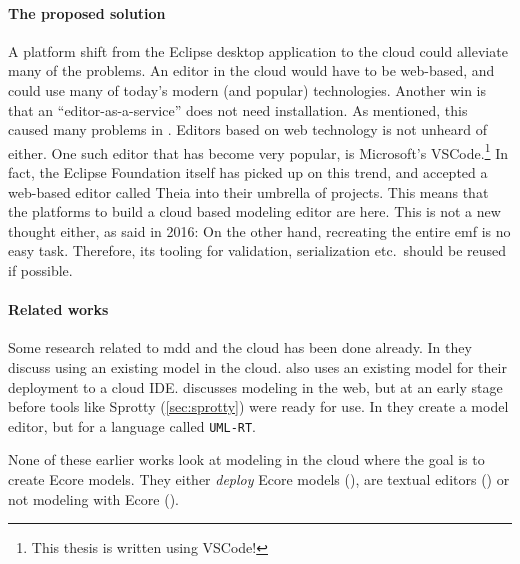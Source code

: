 \paragraph*{The proposed solution}
A platform shift from the \gls{Eclipse} desktop application to the \gls{cloud} could alleviate many of the problems. An editor in the \gls{cloud} would have to be web-based, and could use many of today's modern (and popular) technologies. 
Another win is that an ``editor-as-a-service'' does not need installation.
As mentioned, this caused many problems in \cite{jordicabotFailedConvinceMy2015}. 
Editors based on web technology is not unheard of either. One such editor that has become very popular, is Microsoft's \gls{VSCode}.\footnote{This thesis is written using \gls{VSCode}!}
In fact, the Eclipse Foundation itself has picked up on this trend, and accepted a web-based editor called \gls{Theia} into their umbrella of projects.
This means that the platforms to build a \gls{cloud} based modeling editor are here. 
This is not a new thought either, as \textcite{lajmiModelingBrowserWhat2016} said in 2016: 
On the other hand, recreating the entire \acrlong{emf} is no easy task. Therefore, its tooling for validation, serialization etc.\ should be reused if possible.


\paragraph*{Related works}


Some research related to \gls{mdd} and the \gls{cloud} has been done already.
In \cite{carrascal-manzanaresBuildingMDECloud2015} they discuss using an existing model in the cloud.
\textcite{coulonModularDistributedIDE2020} also uses an existing model for their deployment to a \gls{cloud} \acrshort{IDE}.
\textcite{sainiWebCollaborativeModelling2019} discusses modeling in the web, but at an early stage before tools like Sprotty (\cref{sec:sprotty}) were ready for use.
In \cite{walshClientagnosticHybridModel2020} they create a model editor, but for a language called \texttt{UML-RT}.

None of these earlier works look at modeling in the cloud where the goal is to create \gls{Ecore} models. They either \emph{deploy} \gls{Ecore} models (\cite{carrascal-manzanaresBuildingMDECloud2015,coulonModularDistributedIDE2020}), are textual editors (\cite{coulonModularDistributedIDE2020,sainiWebCollaborativeModelling2019}) or not modeling with \gls{Ecore} (\cite{walshClientagnosticHybridModel2020}).
